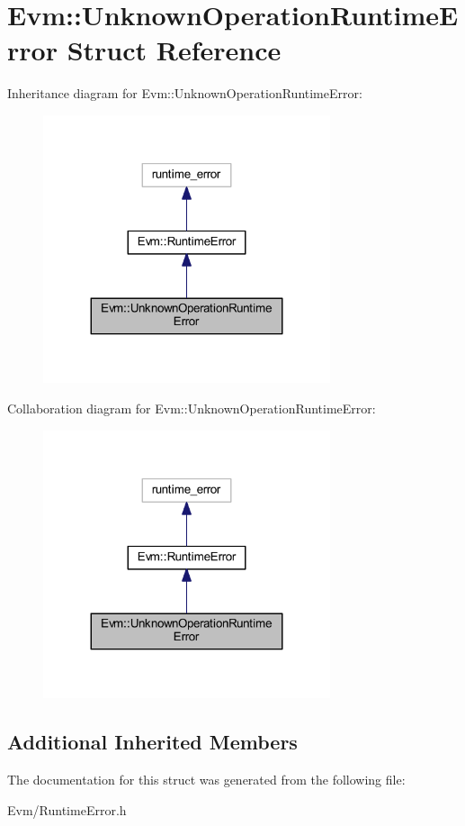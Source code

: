 \hypertarget{struct_evm_1_1_unknown_operation_runtime_error}{}\section{Evm\+:\+:Unknown\+Operation\+Runtime\+Error Struct Reference}
\label{struct_evm_1_1_unknown_operation_runtime_error}


Inheritance diagram for Evm\+:\+:Unknown\+Operation\+Runtime\+Error\+:
\nopagebreak
\begin{figure}[H]
\begin{center}
\leavevmode
\includegraphics[width=239pt]{struct_evm_1_1_unknown_operation_runtime_error__inherit__graph}
\end{center}
\end{figure}


Collaboration diagram for Evm\+:\+:Unknown\+Operation\+Runtime\+Error\+:
\nopagebreak
\begin{figure}[H]
\begin{center}
\leavevmode
\includegraphics[width=239pt]{struct_evm_1_1_unknown_operation_runtime_error__coll__graph}
\end{center}
\end{figure}
\subsection*{Additional Inherited Members}


The documentation for this struct was generated from the following file\+:\begin{DoxyCompactItemize}
\item 
Evm/Runtime\+Error.\+h\end{DoxyCompactItemize}

